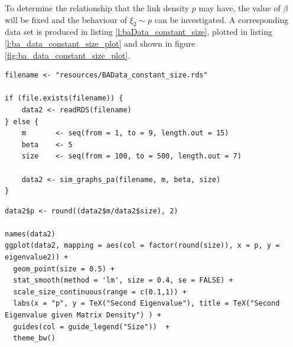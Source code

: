 \documentclass[11pt]{article}
\begin{document}
To determine the relationship that the link density \(p\) may have, the value of
\(\beta\) will be fixed and the behaviour of \(\xi_{2} \sim p\) can be
investigated. A corresponding data set is produced in listing
\ref{l:baData_constant_size}, plotted in listing \ref{l:ba_data_constant_size_plot} and
shown in figure \ref{fig:ba_data_constant_size_plot}.



\begin{listing}[htbp]
\begin{verbatim}
filename <- "resources/BAData_constant_size.rds"

if (file.exists(filename)) {
    data2 <- readRDS(filename)
} else {
    m       <- seq(from = 1, to = 9, length.out = 15)
    beta    <- 5
    size    <- seq(from = 100, to = 500, length.out = 7)

    data2 <- sim_graphs_pa(filename, m, beta, size)
}
\end{verbatim}
\caption{\label{l:baData_constant_size}l:baData\textsubscript{constant}\textsubscript{size}}
\end{listing}

\begin{listing}[htbp]
\begin{verbatim}
data2$p <- round((data2$m/data2$size), 2)

names(data2)
ggplot(data2, mapping = aes(col = factor(round(size)), x = p, y = eigenvalue2)) +
  geom_point(size = 0.5) +
  stat_smooth(method = 'lm', size = 0.4, se = FALSE) +
  scale_size_continuous(range = c(0.1,1)) +
  labs(x = "p", y = TeX("Second Eigenvalue"), title = TeX("Second Eigenvalue given Matrix Density") ) +
  guides(col = guide_legend("Size"))  +
  theme_bw()
\end{verbatim}
\caption{\label{l:ba_data_constant_size_plot}l:ba\textsubscript{data}\textsubscript{constant}\textsubscript{size}\textsubscript{plot}}
\end{listing}
\end{document}
